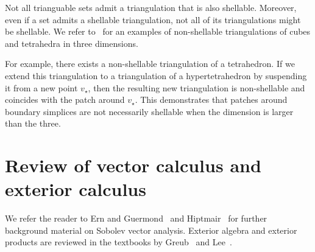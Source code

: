 \documentclass[12pt,a4paper]{article}
\begin{document}
\begin{remark}
    Not all trianguable sets admit a triangulation that is also shellable. 
    Moreover, even if a set admits a shellable triangulation, not all of its triangulations might be shellable. 
    We refer to~\cite[Example 8.9]{ziegler2012lectures} for an examples of non-shellable triangulations of cubes and tetrahedra in three dimensions. 

    For example, there exists a non-shellable triangulation of a tetrahedron. 
    If we extend this triangulation to a triangulation of a hypertetrahedron by suspending it from a new point $v_\star$, 
    then the resulting new triangulation is non-shellable and coincides with the patch around $v_\star$.
    This demonstrates that patches around boundary simplices are not necessarily shellable when the dimension is larger than the three.
\end{remark}


 








\section{Review of vector calculus and exterior calculus}\label{section:calculus}

We refer the reader to Ern and Guermond~\cite{ern2021finite} and Hiptmair~\cite{hiptmair2002finite} for further background material on Sobolev vector analysis. 
Exterior algebra and exterior products are reviewed in the textbooks by Greub~\cite{greub1967multilinear} and Lee~\cite{lee2012smooth}.
\end{document}
